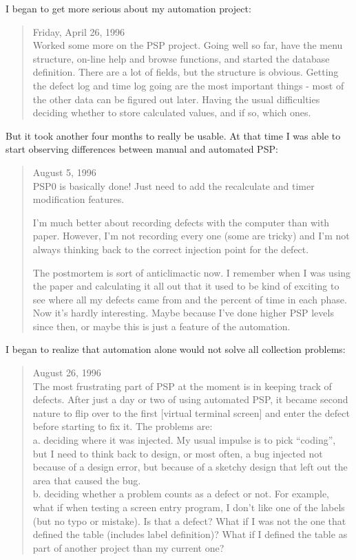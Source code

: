 I began to get more serious about my automation project:
\begin{quote}
  Friday, April 26, 1996\\
  Worked some more on the PSP project.  Going well so far, have the menu
  structure, on-line help and browse functions, and started the database
  definition.  There are a lot of fields, but the structure is obvious.
  Getting the defect log and time log going are the most important things -
  most of the other data can be figured out later.  Having the usual
  difficulties deciding whether to store calculated values, and if so,
  which ones.
\end{quote}

But it took another four months to really be usable.  At that time I was
able to start observing differences between manual and automated PSP:
\begin{quote}
  August 5, 1996\\
  PSP0 is basically done!  Just need to add the recalculate and timer
  modification features.
  
  I'm much better about recording defects with the computer than with
  paper.  However, I'm not recording every one (some are tricky) and I'm
  not always thinking back to the correct injection point for the defect.
  
  The postmortem is sort of anticlimactic now.  I remember when I was using
  the paper and calculating it all out that it used to be kind of exciting
  to see where all my defects came from and the percent of time in each
  phase.  Now it's hardly interesting.  Maybe because I've done higher PSP
  levels since then, or maybe this is just a feature of the automation.
\end{quote}

I began to realize that automation alone would not solve all collection
problems: 

\begin{quote}
  August 26, 1996\\
  The most frustrating part of PSP at the moment is in keeping track of
  defects.  After just a day or two of using automated PSP, it became
  second nature to flip over to the first [virtual terminal screen] and
  enter the defect before starting to fix it.  The problems are:\\
  a. deciding where it was injected.  My usual impulse is to pick ``coding'',
  but I need to think back to design, or most often, a bug injected not
  because of a design error, but because of a sketchy design that left out
  the area that caused the bug.\\
  b.  deciding whether a problem counts as a defect or not.  For example,
  what if when testing a screen entry program, I don't like one of the
  labels (but no typo or mistake).  Is that a defect?  What if I was not
  the one that defined the table (includes label definition)?  What if I
  defined the table as part of another project than my current one?
\end{quote}

